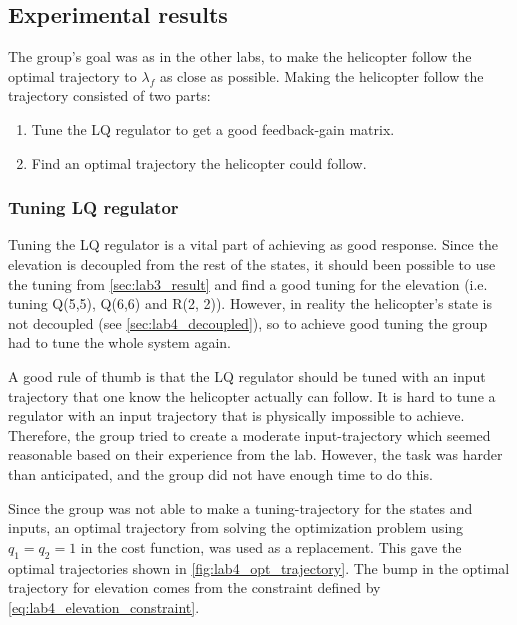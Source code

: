 \documentclass[../main.tex]{subfiles}
\begin{document}
\subsection{Experimental results}
The group's goal was as in the other labs, to make the helicopter follow the optimal trajectory to $ \lambda_f $ as close as possible. Making the helicopter follow the trajectory consisted of two parts: 
\begin{enumerate}
	\item Tune the LQ regulator to get a good feedback-gain matrix.
	\item Find an optimal trajectory the helicopter could follow.
\end{enumerate}

\subsubsection{Tuning LQ regulator}
Tuning the LQ regulator is a vital part of achieving as good response. Since the elevation is decoupled from the rest of the states, it should been possible to use the tuning from \cref{sec:lab3_result} and find a good tuning for the elevation (i.e. tuning Q(5,5), Q(6,6) and R(2, 2)). However, in reality the helicopter's state is not decoupled (see \cref{sec:lab4_decoupled}), so to achieve good tuning the group had to tune the whole system again.

A good rule of thumb is that the LQ regulator should be tuned with an input trajectory that one know the helicopter actually can follow. It is hard to tune a regulator with an input trajectory that is physically impossible to achieve. Therefore, the group tried to create a moderate input-trajectory which seemed reasonable based on their experience from the lab. However, the task was harder than anticipated, and the group did not have enough time to do this. 

Since the group was not able to make a tuning-trajectory for the states and inputs, an optimal trajectory from solving the optimization problem using $q_1 = q_2 = 1$ in the cost function, was used as a replacement. This gave the optimal trajectories shown in \cref{fig:lab4_opt_trajectory}. The bump in the optimal trajectory for elevation comes from the constraint defined by \cref{eq:lab4_elevation_constraint}. 
\end{document}
